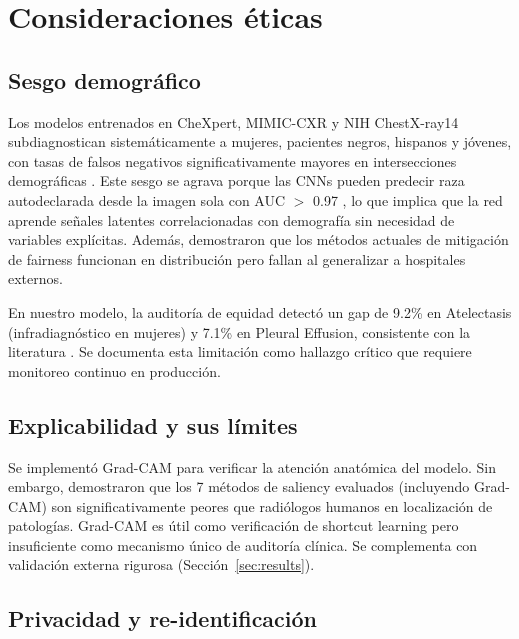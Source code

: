 \section{Consideraciones \'eticas}
\label{sec:ethics}

\subsection{Sesgo demogr\'afico}

Los modelos entrenados en CheXpert, MIMIC-CXR y NIH ChestX-ray14 subdiagnostican sistem\'aticamente a mujeres, pacientes negros, hispanos y j\'ovenes, con tasas de falsos negativos significativamente mayores en intersecciones demogr\'aficas \cite{seyyedkalantari2021bias}. Este sesgo se agrava porque las CNNs pueden predecir raza autodeclarada desde la imagen sola con AUC $>$ 0.97 \cite{gichoya2022ai}, lo que implica que la red aprende se\~nales latentes correlacionadas con demograf\'ia sin necesidad de variables expl\'icitas. Adem\'as, \cite{yang2024fairness} demostraron que los m\'etodos actuales de mitigaci\'on de fairness funcionan en distribuci\'on pero fallan al generalizar a hospitales externos.

En nuestro modelo, la auditor\'ia de equidad detect\'o un gap de 9.2\% en Atelectasis (infradiagn\'ostico en mujeres) y 7.1\% en Pleural Effusion, consistente con la literatura \cite{larrazabal2020gender}. Se documenta esta limitaci\'on como hallazgo cr\'itico que requiere monitoreo continuo en producci\'on.

\subsection{Explicabilidad y sus l\'imites}

Se implement\'o Grad-CAM \cite{selvaraju2017gradcam} para verificar la atenci\'on anat\'omica del modelo. Sin embargo, \cite{saporta2022benchmarking} demostraron que los 7 m\'etodos de saliency evaluados (incluyendo Grad-CAM) son significativamente peores que radi\'ologos humanos en localizaci\'on de patolog\'ias. Grad-CAM es \'util como verificaci\'on de shortcut learning pero insuficiente como mecanismo \'unico de auditor\'ia cl\'inica. Se complementa con validaci\'on externa rigurosa (Secci\'on~\ref{sec:results}).

\subsection{Privacidad y re-identificaci\'on}

